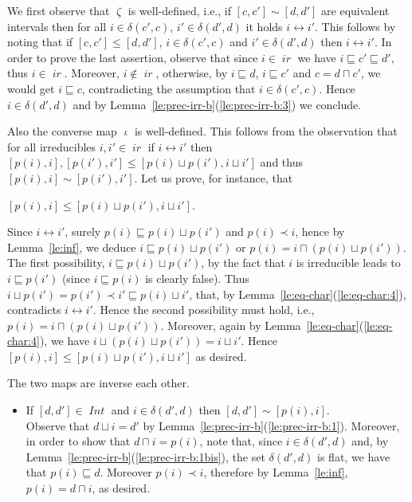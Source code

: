 \documentclass[conference]{IEEEtran}
\renewenvironment{proof}{\begin{IEEEproof}}{\end{IEEEproof}}
\newcommand{\ir}[1]{\ensuremath{\mathop{\mathit{ir}({#1})}}}
\newcommand{\diff}[2]{\ensuremath{\delta({#1},{#2})}}
\newcommand{\pred}[1]{\ensuremath{\mathit{p}({#1})}}
\newcommand{\dint}[2]{\ensuremath{[{#1},{#2}]}}
\newcommand{\IntSet}[1]{\ensuremath{\mathop{\mathit{Int}({#1})}}}
\newcommand{\inir}{\ensuremath{\mathop{\mathit{\zeta}}}}
\newcommand{\irin}{\ensuremath{\mathop{\mathit{\iota}}}}
\begin{document}
\begin{proof}
  We first observe that $\inir$ is well-defined, i.e., if
  $\dint{c}{c'} \sim \dint{d}{d'}$ are equivalent intervals then for
  all $i \in \diff{c'}{c}$, $i' \in \diff{d'}{d}$ it holds
  $i \leftrightarrow i'$. This follows by noting that if
  $\dint{c}{c'} \leq \dint{d}{d'}$, $i \in \diff{c'}{c}$ and
  $i' \in \diff{d'}{d}$ then $i \leftrightarrow i'$.
  In order to prove the last assertion, observe that since
  $i \in \ir{c'}$ we have $i \sqsubseteq c' \sqsubseteq d'$, thus
  $i \in \ir{d'}$.  Moreover, $i \not\in \ir{d}$, otherwise, by
  $i \sqsubseteq d$, $i \sqsubseteq c'$ and $c = d \sqcap c'$, we
  would get $i \sqsubseteq c$, contradicting the assumption that
  $i \in \diff{c'}{c}$. Hence $i \in \diff{d'}{d}$ and by
  Lemma~\ref{le:prec-irr-b}(\ref{le:prec-irr-b:3}) we conclude.

  Also the converse map $\irin$ is well-defined. This follows from the
  observation that for all irreducibles $i, i' \in \ir{D}$ if
  $i \leftrightarrow i'$ then
  $\dint{\pred{i}}{i}, \dint{\pred{i'}}{i'} \leq \dint{\pred{i} \sqcup
    \pred{i'}}{i \sqcup i'}$ and thus
  $\dint{\pred{i}}{i} \sim \dint{\pred{i'}}{i'}$. Let us prove, for
  instance, that
  \begin{center}
    $\dint{\pred{i}}{i} \leq \dint{\pred{i} \sqcup \pred{i'}}{i \sqcup
      i'}$.
  \end{center}
  Since $i \leftrightarrow i'$, surely
  $\pred{i} \sqsubseteq \pred{i} \sqcup \pred{i'}$ and
  $\pred{i} \prec i$, hence by Lemma~\ref{le:inf}, we deduce
  $i \sqsubseteq \pred{i} \sqcup \pred{i'}$ or
  $\pred{i} = i \sqcap (\pred{i} \sqcup \pred{i'})$. The first
  possibility, $i \sqsubseteq \pred{i} \sqcup \pred{i'}$, by the fact
  that $i$ is irreducible leads to $i \sqsubseteq \pred{i'}$ (since
  $i \sqsubseteq \pred{i}$ is clearly false). Thus
  $i \sqcup \pred{i'} = \pred{i'} \prec i' \sqsubseteq \pred{i} \sqcup
  i'$, that, by Lemma~\ref{le:eq-char}(\ref{le:eq-char:4}),
  contradicts $i \leftrightarrow i'$.
  Hence the second possibility must hold, i.e.,
  $\pred{i} = i \sqcap (\pred{i} \sqcup \pred{i'})$. Moreover, again
  by Lemma~\ref{le:eq-char}(\ref{le:eq-char:4}), we have
  $i \sqcup (\pred{i} \sqcup \pred{i'}) = i \sqcup i'$. Hence
  $\dint{\pred{i}}{i} \leq \dint{\pred{i} \sqcup \pred{i'}}{i \sqcup
    i'}$ as desired.
  

  \bigskip
  
  The two maps are inverse each other.
  \begin{itemize}
  \item If $\dint{d}{d'} \in \IntSet{D}$ and $i \in \diff{d'}{d}$ then
    $\dint{d}{d'} \sim \dint{\pred{i}}{i}$.\\
    Observe that $d \sqcup i = d'$ by
    Lemma~\ref{le:prec-irr-b}(\ref{le:prec-irr-b:1}). Moreover, in
    order to show that $d \sqcap i = \pred{i}$, note that, since
    $i \in \diff{d'}{d}$ and, by
    Lemma~\ref{le:prec-irr-b}(\ref{le:prec-irr-b:1bis}), the set
    $\diff{d'}{d}$ is flat, we have that $\pred{i} \sqsubseteq d$.
    Moreover $\pred{i} \prec i$, therefore by Lemma~\ref{le:inf},
    $\pred{i} = d \sqcap i$, as desired.
    

\end{itemize}
\end{proof}
\end{document}
